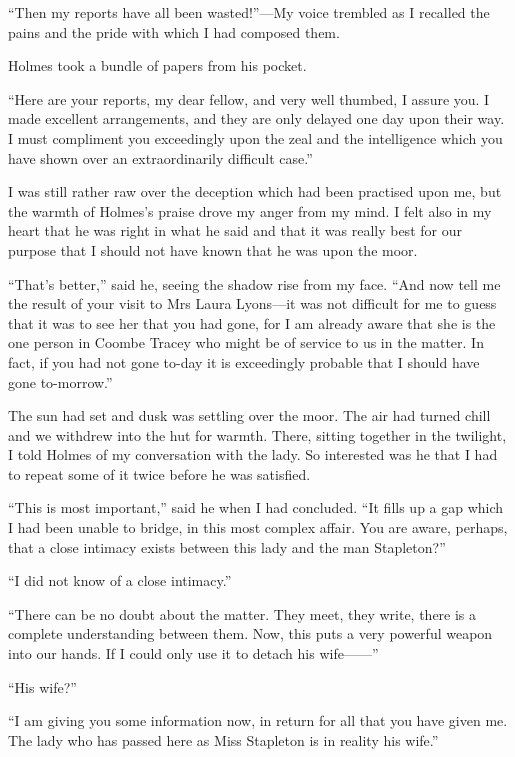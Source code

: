 \documentclass[paper=5.5in:8.5in,BCOR=7mm,twoside,DIV=calc,12pt,usegeometry,openany,chapterprefix,endperiod,headings=big]{scrbook} %
\begin{document}
\enquote{Then my reports have all been wasted!}---My voice trembled as I recalled the pains and the pride with which I had composed them.

Holmes took a bundle of papers from his pocket.

\enquote{Here are your reports, my dear fellow, and very well thumbed, I assure you. I made excellent arrangements, and they are only delayed one day upon their way. I must compliment you exceedingly upon the zeal and the intelligence which you have shown over an extraordinarily difficult case.}

I was still rather raw over the deception which had been practised upon me, but the warmth of Holmes's praise drove my anger from my mind. I felt also in my heart that he was right in what he said and that it was really best for our purpose that I should not have known that he was upon the moor.

\enquote{That's better,} said he, seeing the shadow rise from my face. \enquote{And now tell me the result of your visit to Mrs Laura Lyons---it was not difficult for me to guess that it was to see her that you had gone, for I am already aware that she is the one person in Coombe Tracey who might be of service to us in the matter. In fact, if you had not gone to-day it is exceedingly probable that I should have gone to-morrow.}

The sun had set and dusk was settling over the moor. The air had turned chill and we withdrew into the hut for warmth. There, sitting together in the twilight, I told Holmes of my conversation with the lady. So interested was he that I had to repeat some of it twice before he was satisfied.

\enquote{This is most important,} said he when I had concluded. \enquote{It fills up a gap which I had been unable to bridge, in this most complex affair. You are aware, perhaps, that a close intimacy exists between this lady and the man Stapleton?}

\enquote{I did not know of a close intimacy.}

\enquote{There can be no doubt about the matter. They meet, they write, there is a complete understanding between them. Now, this puts a very powerful weapon into our hands. If I could only use it to detach his wife------}

\enquote{His wife?}

\enquote{I am giving you some information now, in return for all that you have given me. The lady who has passed here as Miss Stapleton is in reality his wife.}
\end{document}

